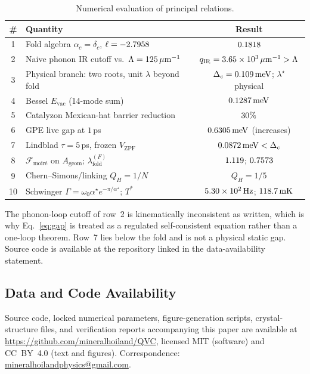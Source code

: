 \documentclass[11pt,letterpaper]{article}
\begin{document}
\begin{table}[htbp]
\centering
\caption{Numerical evaluation of principal \QVC{} relations.}
\begin{tabular}{clc}
\hline
\textbf{\#} & \textbf{Quantity} & \textbf{Result} \\
\hline
1 & Fold algebra $\alpha_c=\delta_c$, $\ell=-2.7958$ & $0.1818$ \\
2 & Naive phonon IR cutoff vs.\ $\Lambda=125\,\mu\mathrm{m}^{-1}$ & $q_{\mathrm{IR}}=3.65\times 10^{3}\,\mu\mathrm{m}^{-1}>\Lambda$ \\
3 & Physical branch: two roots, unit $\lambda$ beyond fold & $\Delta_c=0.109\,\mathrm{meV}$; $\lambda^\star$ physical \\
4 & Bessel $E_{\mathrm{vac}}$ (14-mode sum) & $0.1287\,\mathrm{meV}$ \\
5 & Catalyzon Mexican-hat barrier reduction & $30\%$ \\
6 & GPE live gap at $1$\,ps & $0.6305\,\mathrm{meV}$ (increases) \\
7 & Lindblad $\tau=5$\,ps, frozen $V_{\mathrm{ZPF}}$ & $0.0872\,\mathrm{meV}<\Delta_c$ \\
8 & $\mathcal{F}_{\text{moir\'{e}}}$ on $A_{\mathrm{geom}}$; $\lambda_{\mathrm{fold}}^{(F)}$ & $1.119$; $0.7573$ \\
9 & Chern--Simons/linking $Q_H=1/N$ & $Q_H=1/5$ \\
10 & Schwinger $\Gamma=\omega_0\alpha^\star e^{-\pi/\alpha^\star}$; $T^*$ & $5.30\times 10^{2}\,\mathrm{Hz}$; $118.7\,\mathrm{mK}$ \\
\hline
\end{tabular}
\label{tab:verification}
\end{table}

The phonon-loop cutoff of row~2 is kinematically inconsistent as written, which is why Eq.~\eqref{eq:gap} is treated as a regulated self-consistent equation rather than a one-loop theorem. Row~7 lies below the fold and is not a physical static gap. Source code is available at the repository linked in the data-availability statement.

\subsection{Data and Code Availability}
\label{app:data}

Source code, locked numerical parameters, figure-generation scripts, crystal-structure files, and verification reports accompanying this paper are available at \url{https://github.com/mineralhoiland/QVC}, licensed MIT (software) and CC~BY~4.0 (text and figures). Correspondence: \href{mailto:mineralhoilandphysics@gmail.com}{mineralhoilandphysics@gmail.com}.



\end{document}
